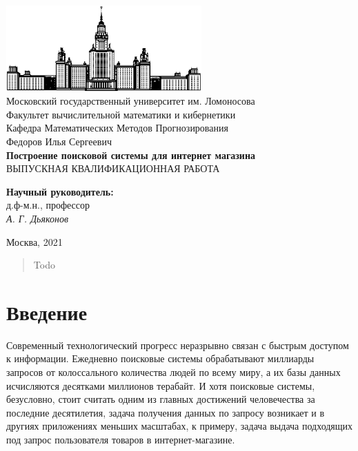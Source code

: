 \documentclass[12pt,a4paper]{article}
\begin{document}
\begin{titlepage}
\begin{center}

    \bigskip
    \includegraphics[width=75mm]{msu.eps}\\
    \bigskip
    Московский государственный университет им. Ломоносова\\
    Факультет вычислительной математики и кибернетики\\
    Кафедра Математических Методов Прогнозирования\\[10mm]
    
    Федоров Илья Сергеевич \\
    \textsf{\large\bfseries
        Построение поисковой системы для интернет магазина
    }\\[10mm]
    
    ВЫПУСКНАЯ КВАЛИФИКАЦИОННАЯ РАБОТА
    \vspace{\fill}
    \begin{flushright}
        \parbox{0.5\textwidth}{
            \textbf{Научный руководитель:}\\
            д.ф-м.н., профессор\\
            \emph{А. Г. Дьяконов}
        }
    \end{flushright}

    \vspace{\fill}
    Москва, 2021
\end{center}
\end{titlepage}

\newpage
\renewcommand{\contentsname}{Содержание}
\tableofcontents

\newpage
\begin{abstract}
Todo
\end{abstract}

\newpage
\section{Введение}

Современный технологический прогресс неразрывно связан с быстрым доступом к информации. Ежедневно поисковые системы обрабатывают миллиарды запросов от колоссального количества людей по всему миру, а их базы данных исчисляются десятками миллионов терабайт. И хотя поисковые системы, безусловно, стоит считать одним из главных достижений человечества за последние десятилетия, задача получения данных по запросу возникает и в другиях приложениях меньших масштабах, к примеру, задача выдача подходящих под запрос пользователя товаров в интернет-магазине. 
\end{document}
